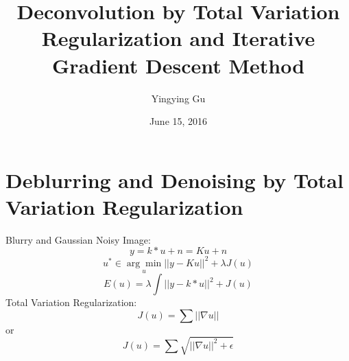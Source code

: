 \documentclass[paper=a4, fontsize=11pt]{scrartcl}
\begin{document}
\title{\color{bl} Deconvolution by Total Variation Regularization and Iterative Gradient Descent Method}
\author{Yingying Gu}
\date{June 15, 2016}
\maketitle

\section{Deblurring and Denoising by Total Variation Regularization}
Blurry and Gaussian Noisy Image:
\begin{equation}
y=k \ast u + n = Ku + n
\end{equation}
\begin{equation}
u^* \in \underset{u}{\arg\min} ||y-Ku||^2 + \lambda J(u)
\end{equation}
\begin{equation}
E(u) = \lambda \int ||y-k*u||^2 + J(u)
\end{equation}
Total Variation Regularization:
\begin{equation}
J(u)= \sum ||\nabla u||
\end{equation}
or
\begin{equation}
J(u)= \sum \sqrt{||\nabla u||^2+\epsilon}
\end{equation}
\end{document}
